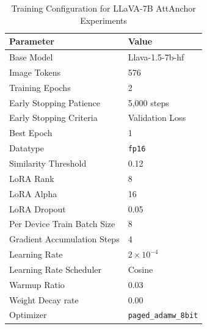 \documentclass[11pt]{article}
\begin{document}
\begin{table}[H]
    \centering
    \small
    \begin{tabular}{ll}
    \hline
    \textbf{Parameter}       & \textbf{Value}               \\
    \hline
    Base Model          & Llava-1.5-7b-hf                            \\
    Image Tokens          & 576                            \\
    Training Epochs          & 2                            \\
    Early Stopping Patience  & 5,000 steps
           \\
    Early Stopping Criteria  & Validation Loss
           \\
    Best Epoch               & 1
           \\
    Datatype                 & \texttt{fp16}                \\
    Similarity Threshold                & 0.12                            \\
    LoRA Rank                & 8                            \\
    LoRA Alpha                & 16                            \\
    LoRA Dropout             & 0.05                         \\
    Per Device Train Batch Size         & 8
    \\
    Gradient Accumulation Steps  & 4
    \\
    Learning Rate            & $2 \times 10^{-4}$ 
    \\
    Learning Rate Scheduler           & Cosine 
    \\
    
    Warmup Ratio                 & 0.03                \\
    Weight Decay rate                 & 0.00                \\
    Optimizer                & \texttt{paged\_adamw\_8bit}  \\
    \hline
    \end{tabular}
    \caption{Training Configuration for LLaVA-7B AttAnchor Experiments}
    \label{tab:cos_train_config_7b}
    \end{table}
\end{document}
